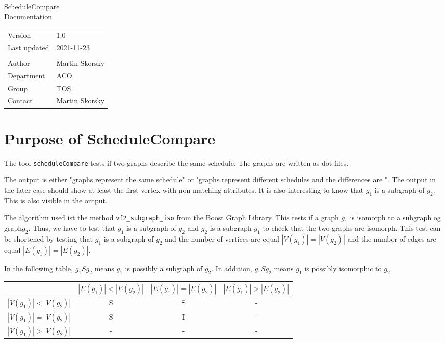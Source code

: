 \documentclass[12pt,a4paper]{report}
\begin{document}
\begin{titlepage}
\begin{center}
\vspace{2em}
\Huge{ScheduleCompare}\\[2cm]
\Large{Documentation}\\[2cm]
\begin{large}
\begin{tabularx}{\textwidth}{Xl}
Version & 1.0\\
Last updated & 2021-11-23\\
\vspace{1.5cm}\\
Author & Martin Skorsky\\
Department & ACO \\
Group & TOS\\
Contact & Martin Skorsky
\end{tabularx}%
\end{large}

\vfill

\end{center}
\end{titlepage}
\tableofcontents
\chapter{Purpose of ScheduleCompare}
The tool \texttt{scheduleCompare} tests if two graphs describe the same schedule. The graphs are written as dot-files.

The output is either "graphs represent the same schedule" or "graphs represent different schedules and the differences are \textellipsis".
The output in the later case should show at least the first vertex with non-matching attributes.
It is also interesting to know that $g_1$ is a subgraph of $g_2$. This is also visible in the output.

The algorithm used ist the method \texttt{vf2\_subgraph\_iso} from the Boost Graph Library. This tests if a graph $g_1$ is isomorph
to a subgraph og graph$g_2$. Thus, we have to test that $g_1$ is a subgraph of $g_2$ and $g_2$ is a subgraph $g_1$ to check
that the two graphs are isomorph. This test can be shortened by testing that $g_1$ is a subgraph of $g_2$ and the number
of vertices are equal $|V(g_1)| = |V(g_2)|$ and the number of edges are equal $|E(g_1)| = |E(g_2)|$.

In the following table, $g_1 S g_2$
means $g_1$ is possibly a subgraph of $g_2$. In addition, $g_1 S g_2$ means $g_1$ is possibly isomorphic to $g_2$.
\begin{table}
\label{tab:cardinalities}
\begin{tabular}[t]{|c|ccc|}
\hline
                     & $|E(g_1)|<|E(g_2)|$ & $|E(g_1)|=|E(g_2)|$ & $|E(g_1)|>|E(g_2)|$ \\ \hline
 $|V(g_1)|<|V(g_2)|$ &          S          &          S          &          -  \\
 $|V(g_1)|=|V(g_2)|$ &          S          &          I          &          -  \\
 $|V(g_1)|>|V(g_2)|$ &          -          &          -          &          -  \\ \hline
\end{tabular}
\end{table}
\end{document}
